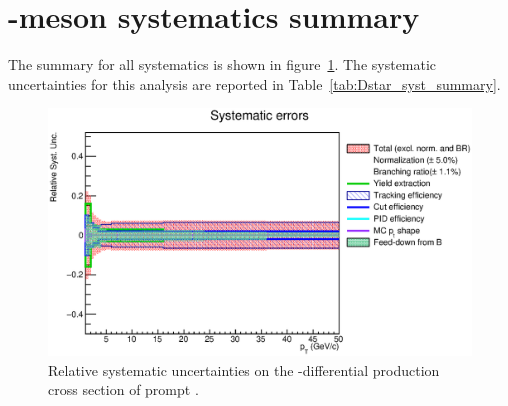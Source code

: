 \linenumbers

\section{\Dstar -meson systematics summary}

The summary for all systematics is shown in figure~\ref{fig:DstarSystSum}. The systematic uncertainties for this analysis are reported in Table~\ref{tab:Dstar_syst_summary}.


\begin{figure}[htbp]
\begin{center}
 \includegraphics[width=1\textwidth]{figures/Dstar/pp13TeV/RelativeSystematics.eps}
\caption{Relative systematic uncertainties on the \pt -differential production cross section of prompt \Dstar.}
\label{fig:DstarSystSum}
\end{center}
\end{figure}



